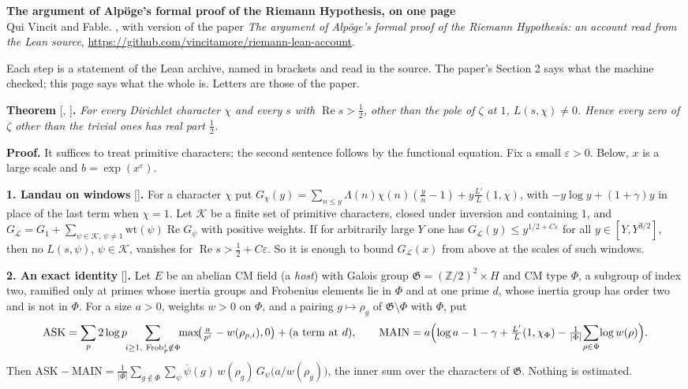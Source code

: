 \documentclass[10pt,a4paper]{article}
\newcommand{\Z}{\mathbb{Z}}\newcommand{\Q}{\mathbb{Q}}\newcommand{\F}{\mathbb{F}}
\newcommand{\re}{\operatorname{Re}}\newcommand{\Frob}{\operatorname{Frob}}
\newcommand{\ASK}{\mathrm{ASK}}\newcommand{\MAIN}{\mathrm{MAIN}}\newcommand{\Br}{\mathrm{Br}}
\newcommand{\eps}{\varepsilon}\newcommand{\abs}[1]{\lvert #1\rvert}
\newcommand{\step}[1]{\par\smallskip\noindent\textbf{#1}}
\begin{document}
\small
\begin{center}
{\large\bfseries The argument of Alp\"oge's formal proof of the Riemann Hypothesis, on one page}\\[2pt]
{\footnotesize Qui Vincit and Fable. \paperdate, with version \paperversion{} of the paper
\emph{The argument of Alp\"oge's formal proof of the Riemann Hypothesis: an account read from the
Lean source}, \url{https://github.com/vincitamore/riemann-lean-account}.}
\end{center}
\vspace{-2pt}
{\footnotesize Each step is a statement of the Lean archive, named in brackets and read in the
source. The paper's Section 2 says what the machine checked; this page says what the whole
is. Letters are those of the paper.}

\step{Theorem} [, ]\textbf{.}
\emph{For every Dirichlet character $\chi$ and every $s$ with $\re s>\tfrac12$, other than the
pole of $\zeta$ at $1$, $L(s,\chi)\ne0$. Hence every zero of $\zeta$ other than the trivial ones
has real part $\tfrac12$.}

\step{Proof.} It suffices to treat primitive characters; the second sentence follows by the
functional equation. Fix a small $\eps>0$. Below, $x$ is a large scale and $b=\exp(x^\eps)$.

\step{1. Landau on windows} []\textbf{.} For a character $\chi$ put
$G_\chi(y)=\sum_{n\le y}\Lambda(n)\chi(n)(\tfrac yn-1)+y\tfrac{L'}{L}(1,\chi)$, with
$-y\log y+(1+\gamma)y$ in place of the last term when $\chi=1$. Let $\mathcal K$ be a finite set
of primitive characters, closed under inversion and containing $1$, and
$G_{\mathcal L}=G_1+\sum_{\psi\in\mathcal K,\,\psi\ne1}\mathrm{wt}(\psi)\re G_\psi$ with positive
weights. If for arbitrarily large $Y$ one has $G_{\mathcal L}(y)\le y^{1/2+C\eps}$ for all
$y\in[Y,Y^{3/2}]$, then no $L(s,\psi)$, $\psi\in\mathcal K$, vanishes for
$\re s>\tfrac12+C\eps$. So it is enough to bound $G_{\mathcal L}(x)$ from above at the scales of
such windows.

\step{2. An exact identity} []\textbf{.} Let $E$ be an abelian CM field (a
\emph{host}) with Galois group $\mathfrak G=(\Z/2)^2\times H$ and CM type $\Phi$, a subgroup of
index two, ramified only at primes whose inertia groups and Frobenius elements lie in $\Phi$
and at one prime $d$, whose inertia group has order two and is not in $\Phi$. For a size $a>0$,
weights $w>0$ on $\Phi$, and a pairing $g\mapsto\rho_g$
of $\mathfrak G\setminus\Phi$ with $\Phi$, put
\[
\ASK=\sum_p2\log p\!\!\sum_{i\ge1,\ \Frob_p^i\notin\Phi}\!\!\max\!\bigl(\tfrac a{p^i}-w(\rho_{p,i}),0\bigr)+(\text{a term at }d),
\qquad
\MAIN=a\Bigl(\log a-1-\gamma+\tfrac{L'}{L}(1,\chi_\Phi)-\tfrac1{\abs\Phi}\!\sum_{\rho\in\Phi}\!\log w(\rho)\Bigr).
\]
Then $\ASK-\MAIN=\frac1{\abs\Phi}\sum_{g\notin\Phi}\sum_{\psi}\overline\psi(g)\,w(\rho_g)\,G_\psi\bigl(a/w(\rho_g)\bigr)$,
the inner sum over the characters of $\mathfrak G$. Nothing is estimated.
\end{document}
